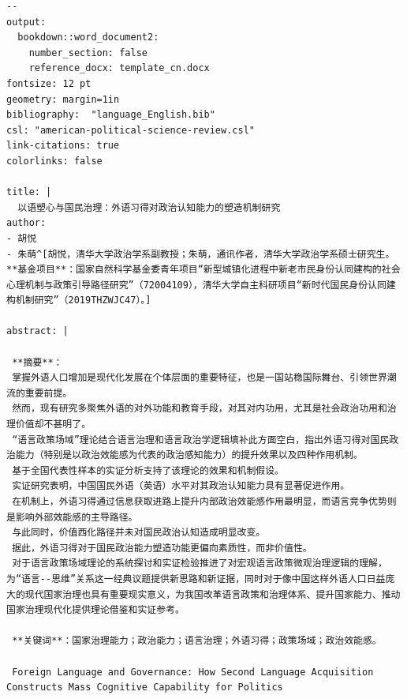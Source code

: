 \documentclass[
  letterpaper,
  DIV=11,
  numbers=noendperiod,
  oneside]{scrreprt}
\begin{document}
\begin{verbatim}
--
output:
  bookdown::word_document2:
    number_section: false
    reference_docx: template_cn.docx
fontsize: 12 pt
geometry: margin=1in
bibliography:  "language_English.bib"
csl: "american-political-science-review.csl"
link-citations: true
colorlinks: false

title: |
  以语塑心与国民治理：外语习得对政治认知能力的塑造机制研究
author: 
- 胡悦
- 朱萌^[胡悦，清华大学政治学系副教授；朱萌，通讯作者，清华大学政治学系硕士研究生。**基金项目**：国家自然科学基金委青年项目“新型城镇化进程中新老市民身份认同建构的社会心理机制与政策引导路径研究”（72004109），清华大学自主科研项目“新时代国民身份认同建构机制研究”（2019THZWJC47）。]

abstract: |

 **摘要**：
 掌握外语人口增加是现代化发展在个体层面的重要特征，也是一国站稳国际舞台、引领世界潮流的重要前提。
 然而，现有研究多聚焦外语的对外功能和教育手段，对其对内功用，尤其是社会政治功用和治理价值却不甚明了。
 “语言政策场域”理论结合语言治理和语言政治学逻辑填补此方面空白，指出外语习得对国民政治能力（特别是以政治效能感为代表的政治感知能力）的提升效果以及四种作用机制。
 基于全国代表性样本的实证分析支持了该理论的效果和机制假设。
 实证研究表明，中国国民外语（英语）水平对其政治认知能力具有显著促进作用。
 在机制上，外语习得通过信息获取进路上提升内部政治效能感作用最明显，而语言竞争优势则是影响外部效能感的主导路径。
 与此同时，价值西化路径并未对国民政治认知造成明显改变。
 据此，外语习得对于国民政治能力塑造功能更偏向素质性，而非价值性。
 对于语言政策场域理论的系统探讨和实证检验推进了对宏观语言政策微观治理逻辑的理解，为“语言--思维”关系这一经典议题提供新思路和新证据，同时对于像中国这样外语人口日益庞大的现代国家治理也具有重要现实意义，为我国改革语言政策和治理体系、提升国家能力、推动国家治理现代化提供理论借鉴和实证参考。
 
 **关键词**：国家治理能力；政治能力；语言治理；外语习得；政策场域；政治效能感。
 
 Foreign Language and Governance: How Second Language Acquisition Constructs Mass Cognitive Capability for Politics
 

\end{verbatim}
\end{document}
